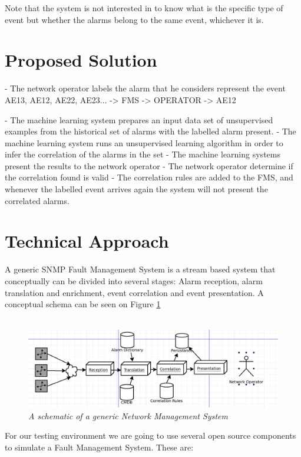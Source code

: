 \documentclass[10pt,a4paper]{article}
\begin{document}
Note that the system is not interested in to know what is the specific type of event but whether the alarms belong to the same event, whichever it is.

  \section{Proposed Solution}
  
- The network operator labels the alarm that he considers represent the event
AE13, AE12, AE22, AE23... -> FMS -> OPERATOR -> AE12

- The machine learning system prepares an input data set of unsupervised examples from the historical set of alarms with the labelled alarm present.
- The machine learning system runs an unsupervised learning algorithm in order to infer the correlation of the alarms in the set
- The machine learning systems present the results to the network operator
- The network operator determine if the correlation found is valid
- The correlation rules are added to the FMS, and whenever the labelled event arrives again the system will not present the correlated alarms.

  \section{Technical Approach}
A generic SNMP Fault Management System is a stream based system that conceptually can be divided into several stages: Alarm reception, alarm translation and enrichment, event correlation and event presentation. A conceptual schema can be seen on Figure \ref{fig:nms_generaldiagram}
\\\
\begin{figure}[H]
 \includegraphics[scale=0.4]{NMS_GeneralDiagram.png}
  \centering
  \caption{\textit{A schematic of a generic Network Management System}}
  \label{fig:nms_generaldiagram}
\end{figure}	

For our testing environment we are going to use several open source components to simulate a Fault Management System. These are:
\end{document}
